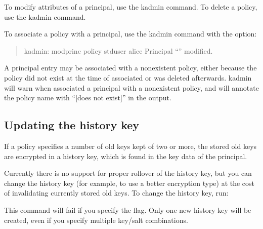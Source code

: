 \documentclass[letterpaper,10pt,english]{sphinxmanual}
\begin{document}
\sphinxAtStartPar
To modify attributes of a principal, use the kadmin 
command.  To delete a policy, use the kadmin 
command.

\sphinxAtStartPar
To associate a policy with a principal, use the kadmin
 command with the  option:
\begin{quote}

\sphinxAtStartPar
kadmin: modprinc \sphinxhyphen{}policy stduser alice
Principal “” modified.
\end{quote}

\sphinxAtStartPar
A principal entry may be associated with a nonexistent policy, either
because the policy did not exist at the time of associated or was
deleted afterwards.  kadmin will warn when associated a principal with
a nonexistent policy, and will annotate the policy name with “{[}does
not exist{]}” in the  output.


\subsection{Updating the history key}
\label{\detokenize{admin/database:updating-the-history-key}}\label{\detokenize{admin/database:updating-history-key}}
\sphinxAtStartPar
If a policy specifies a number of old keys kept of two or more, the
stored old keys are encrypted in a history key, which is found in the
key data of the  principal.

\sphinxAtStartPar
Currently there is no support for proper rollover of the history key,
but you can change the history key (for example, to use a better
encryption type) at the cost of invalidating currently stored old
keys.  To change the history key, run:

\begin{sphinxVerbatim}[commandchars=\\\{\}]
   
\end{sphinxVerbatim}

\sphinxAtStartPar
This command will fail if you specify the  flag.  Only one
new history key will be created, even if you specify multiple key/salt
combinations.
\end{document}

